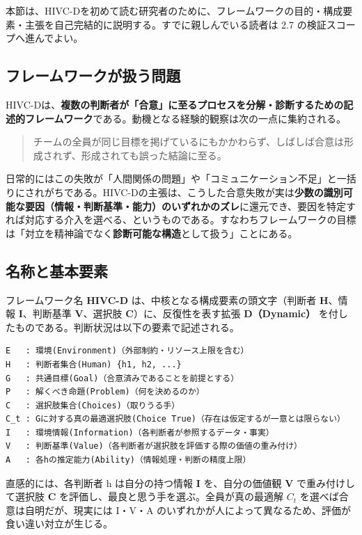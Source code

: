 \documentclass[11pt]{ltjsarticle}
\newcommand{\Ct}{\ensuremath{C_t}}
\begin{document}
本節は、HIVC-Dを初めて読む研究者のために、フレームワークの目的・構成要素・主張を自己完結的に説明する。すでに親しんでいる読者は 2.7 の検証スコープへ進んでよい。

\subsection{フレームワークが扱う問題}

HIVC-Dは、\textbf{複数の判断者が「合意」に至るプロセスを分解・診断するための記述的フレームワーク}である。動機となる経験的観察は次の一点に集約される。

\begin{quote}
チームの全員が同じ目標を掲げているにもかかわらず、しばしば合意は形成されず、形成されても誤った結論に至る。
\end{quote}

日常的にはこの失敗が「人間関係の問題」や「コミュニケーション不足」と一括りにされがちである。HIVC-Dの主張は、こうした合意失敗が実は\textbf{少数の識別可能な要因（情報・判断基準・能力）のいずれかのズレ}に還元でき、要因を特定すれば対応する介入を選べる、というものである。すなわちフレームワークの目標は「対立を精神論でなく\textbf{診断可能な構造}として扱う」ことにある。

\subsection{名称と基本要素}

フレームワーク名 \textbf{HIVC-D} は、中核となる構成要素の頭文字（判断者 \textbf{H}、情報 \textbf{I}、判断基準 \textbf{V}、選択肢 \textbf{C}）に、反復性を表す拡張 \textbf{D（Dynamic）} を付したものである。判断状況は以下の要素で記述される。

\begin{Verbatim}[frame=single,fontsize=\small]
E   : 環境(Environment)（外部制約・リソース上限を含む）
H   : 判断者集合(Human) {h1, h2, ...}
G   : 共通目標(Goal)（合意済みであることを前提とする）
P   : 解くべき命題(Problem)（何を決めるのか）
C   : 選択肢集合(Choices)（取りうる手）
C_t : Gに対する真の最適選択肢(Choice True)（存在は仮定するが一意とは限らない）
I   : 環境情報(Information)（各判断者が参照するデータ・事実）
V   : 判断基準(Value)（各判断者が選択肢を評価する際の価値の重み付け）
A   : 各hの推定能力(Ability)（情報処理・判断の精度上限）
\end{Verbatim}

直感的には、各判断者 h は自分の持つ情報 \textbf{I} を、自分の価値観 \textbf{V} で重み付けして選択肢 \textbf{C} を評価し、最良と思う手を選ぶ。全員が真の最適解 \Ct{} を選べば合意は自明だが、現実には I・V・A のいずれかが人によって異なるため、評価が食い違い対立が生じる。
\end{document}
